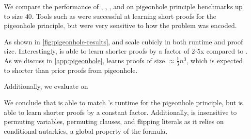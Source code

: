 We compare the performance of \tool, \cadical, \sadical, and \prelearn on pigeonhole principle benchmarks up to size $40$. Tools such as \sadical were successful at learning short proofs for the pigeonhole principle, but were very sensitive to how the problem was encoded.

As shown in \autoref{fig:pigeonhole-results}, \prelearn and \tool scale cubicly in both runtime and proof size. Interestingly, \tool is able to learn shorter proofs by a factor of $2$-$5$x compared to \prelearn. As we discuss in \autoref{app:pigeonhole}, \tool learns proofs of size $\approx \frac13 n^3$, which is expected to shorter than prior proofs from pigeonhole.

Additionally, we evaluate \tool on


We conclude that \tool is able to match \sadical's runtime for the pigeonhole principle, but is able to learn shorter proofs by a constant factor. Additionally, \tool is insensitive to permuting variables, permuting clauses, and flipping literals as it relies on conditional autarkies, a global property of the formula.


